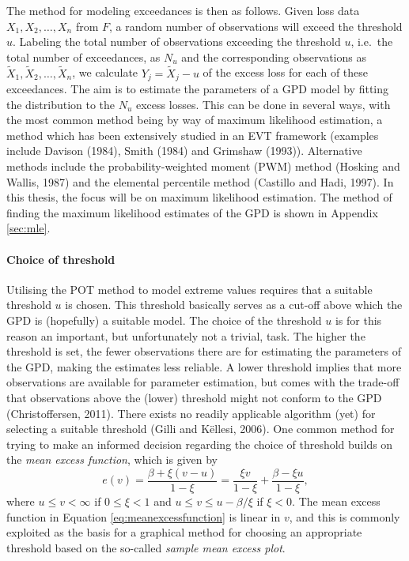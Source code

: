 \documentclass[a4paper,11pt]{article}
\theoremstyle{definition}
\theoremstyle{definition}
\theoremstyle{definition}
\theoremstyle{definition}
\theoremstyle{remark}
\begin{document}
The method for modeling exceedances is then as follows. Given loss data \(X_1, X_2, \dots, X_n\) from \(F\), a random number of observations will exceed the threshold \(u\). Labeling the total number of observations exceeding the threshold \(u\), i.e.~the total number of exceedances, as \(N_u\) and the corresponding observations as \(\tilde X_1, \tilde X_2, \dots, \tilde X_n\), we calculate \(Y_j = \tilde X_j - u\) of the excess loss for each of these exceedances. The aim is to estimate the parameters of a GPD model by fitting the distribution to the \(N_u\) excess losses. This can be done in several ways, with the most common method being by way of maximum likelihood estimation, a method which has been extensively studied in an EVT framework (examples include Davison (1984), Smith (1984) and Grimshaw (1993)). Alternative methods include the probability-weighted moment (PWM) method (Hosking and Wallis, 1987) and the elemental percentile method (Castillo and Hadi, 1997). In this thesis, the focus will be on maximum likelihood estimation. The method of finding the maximum likelihood estimates of the GPD is shown in Appendix \ref{sec:mle}.

\hypertarget{choice-of-threshold}{%
\paragraph{Choice of threshold}\label{choice-of-threshold}}

Utilising the POT method to model extreme values requires that a suitable threshold \(u\) is chosen. This threshold basically serves as a cut-off above which the GPD is (hopefully) a suitable model. The choice of the threshold \(u\) is for this reason an important, but unfortunately not a trivial, task. The higher the threshold is set, the fewer observations there are for estimating the parameters of the GPD, making the estimates less reliable. A lower threshold implies that more observations are available for parameter estimation, but comes with the trade-off that observations above the (lower) threshold might not conform to the GPD (Christoffersen, 2011). There exists no readily applicable algorithm (yet) for selecting a suitable threshold (Gilli and Këllesi, 2006). One common method for trying to make an informed decision regarding the choice of threshold builds on the \emph{mean excess function}, which is given by
\begin{equation}
e(v) = \frac{\beta + \xi (v-u)}{1-\xi} = \frac{\xi v}{1 - \xi} + \frac{\beta - \xi u}{1 - \xi},
\label{eq:meanexcessfunction}
\end{equation}
where \(u \leq v < \infty\) if \(0 \leq \xi < 1\) and \(u \leq v \leq u - \beta/\xi\) if \(\xi < 0\). The mean excess function in Equation \eqref{eq:meanexcessfunction} is linear in \(v\), and this is commonly exploited as the basis for a graphical method for choosing an appropriate threshold based on the so-called \emph{sample mean excess plot}.
\end{document}
